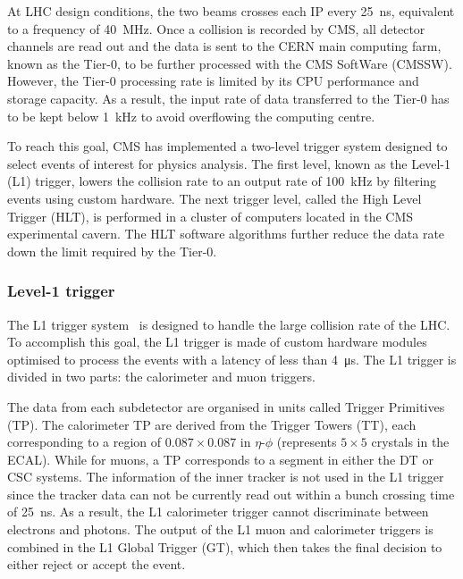 At LHC design conditions, the two beams crosses each IP every \SI{25}{\ns}, equivalent to a frequency of \SI{40}{\MHz}. Once a collision is recorded by CMS, all detector channels are read out and the data is sent to the CERN main computing farm, known as the Tier-0, to be further processed with the CMS SoftWare (CMSSW). However, the Tier-0 processing rate is limited by its CPU performance and storage capacity. As a result, the input rate of data transferred to the Tier-0 has to be kept below \SI{1}{\kHz} to avoid overflowing the computing centre.

To reach this goal, CMS has implemented a two-level trigger system designed to select events of interest for physics analysis. The first level, known as the Level-1 (L1) trigger, lowers the collision rate to an output rate of \SI{100}{\kHz} by filtering events using custom hardware. The next trigger level, called the High Level Trigger (HLT), is performed in a cluster of computers located in the CMS experimental cavern. The HLT software algorithms further reduce the data rate down the limit required by the Tier-0.

\subsubsection{Level-1 trigger}\label{sec:Experiment_CMS_Trigger_L1}

The L1 trigger system~\cite{CMSTrigger} is designed to handle the large collision rate of the LHC. To accomplish this goal, the L1 trigger is made of custom hardware modules optimised to process the events with a latency of less than \SI{4}{\us}. The L1 trigger is divided in two parts: the calorimeter and muon triggers.

The data from each subdetector are organised in units called Trigger Primitives (TP). The calorimeter TP are derived from the Trigger Towers (TT), each corresponding to a region of ${0.087}\times{0.087}$ in $\eta$-$\phi$ (represents $5\times{5}$ crystals in the ECAL). While for muons, a TP corresponds to a segment in either the DT or CSC systems. The information of the inner tracker is not used in the L1 trigger since the tracker data can not be currently read out within a bunch crossing time of \SI{25}{\ns}. As a result, the L1 calorimeter trigger cannot discriminate between electrons and photons. The output of the L1 muon and calorimeter triggers is combined in the L1 Global Trigger (GT), which then takes the final decision to either reject or accept the event.

